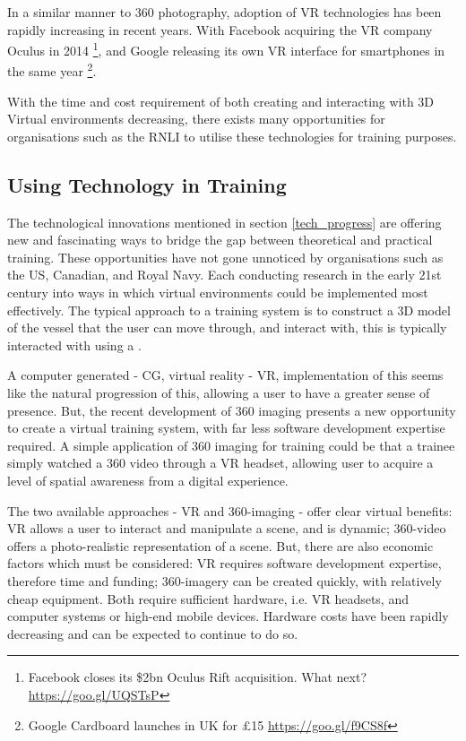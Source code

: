 \documentclass[ %
                    author={Elis Jones},
                supervisor={Dr. Kirsten Cater},
                    degree={BSc},
                     title={The Effect of Presentation Medium on Spatial Cognition},
                  subtitle={in the Virtual Environment},
                      year={2018} ]{dissertation}
\begin{document}
In a similar manner to 360 photography, adoption of VR technologies has been rapidly increasing in recent years. With Facebook acquiring the VR company Oculus in 2014 \footnote{Facebook closes its \$2bn Oculus Rift acquisition. What next? \url{https://goo.gl/UQSTsP}}, and Google releasing its own VR interface for smartphones in the same year \footnote{Google Cardboard launches in UK for £15 \url{https://goo.gl/f9CS8f}}.  

With the time and cost requirement of both creating and interacting with 3D Virtual environments decreasing, there exists many opportunities for organisations such as the RNLI to utilise these technologies for training purposes. 

\subsection{Using Technology in Training }
The technological innovations mentioned in section \ref{tech_progress} are offering new and fascinating ways to bridge the gap between theoretical and practical training.  These opportunities have not gone unnoticed by organisations such as the US, Canadian, and Royal Navy. Each conducting research in the early 21st century into ways in which virtual environments could be implemented most effectively. The typical approach to a training system is to construct a 3D model of the vessel that the user can move through, and interact with, this is typically interacted with using a . 

A computer generated - CG, virtual reality - VR, implementation of this seems like the natural progression of this, allowing a user to have a greater sense of presence. But, the recent development of 360 imaging presents a new opportunity to create a virtual training system, with far less software development expertise required. A simple application of 360 imaging for training could be that a trainee simply watched a 360 video through a VR headset, allowing user to acquire a level of spatial awareness from a digital experience.

The two available approaches - VR and 360-imaging - offer clear virtual benefits: VR allows a user to interact and manipulate a scene, and is dynamic; 360-video offers a photo-realistic representation of a scene. But, there are also economic factors which must be considered: VR requires software development expertise, therefore time and funding; 360-imagery can be created quickly, with relatively cheap equipment. Both require sufficient hardware, i.e. VR headsets, and computer systems or high-end mobile devices.  Hardware costs have been rapidly decreasing and can be expected to continue to do so. 
\end{document}

